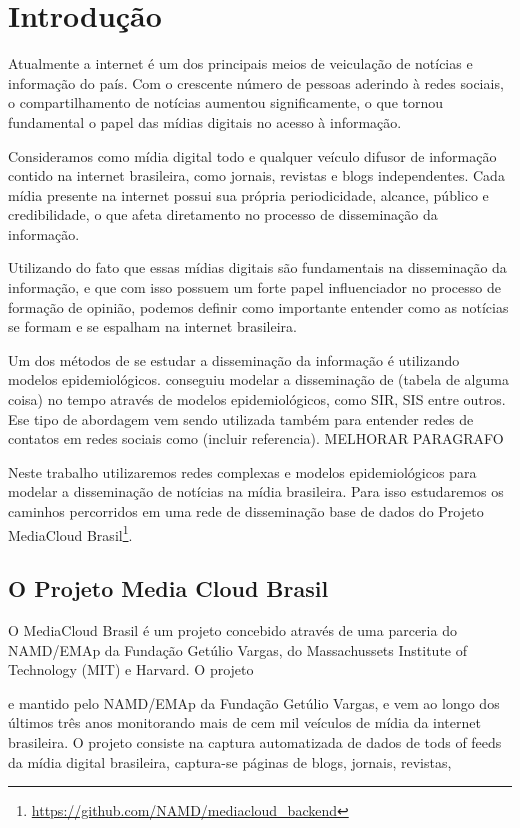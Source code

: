 \documentclass[a4paper,12pt]{article}
\begin{document}
\pagebreak

\section{Introdução}

Atualmente a internet é um dos principais meios de veiculação de notícias e informação do país. Com o crescente
número de pessoas aderindo à redes sociais, o compartilhamento de notícias aumentou significamente, o que tornou fundamental
o papel das mídias digitais no acesso à informação.

Consideramos como mídia digital todo e qualquer veículo difusor de informação contido na internet brasileira, como jornais, revistas e 
blogs independentes. Cada mídia presente na internet possui sua própria periodicidade, alcance, público e credibilidade, o que afeta
diretamento no processo de disseminação da informação.

Utilizando do fato que essas mídias digitais são fundamentais na disseminação da informação, e que com isso possuem um forte papel 
influenciador no processo de formação de opinião, podemos definir como importante entender como as notícias se formam e se espalham
na internet brasileira.

Um dos métodos de se estudar a disseminação da informação é utilizando modelos epidemiológicos. \cite{bettencourt2006power} conseguiu modelar a disseminação de (tabela de alguma coisa) no tempo através de modelos epidemiológicos, como SIR, SIS entre outros. Ese tipo
de abordagem vem sendo utilizada também para entender redes de contatos em redes sociais como (incluir referencia). MELHORAR PARAGRAFO

Neste trabalho utilizaremos redes complexas e modelos epidemiológicos para modelar a disseminação de notícias na mídia brasileira. 
Para isso
estudaremos os caminhos percorridos em uma rede de disseminação  base de dados do Projeto MediaCloud Brasil\footnote[1]{\url{https://github.com/NAMD/mediacloud_backend}}.


\subsection{O Projeto Media Cloud Brasil}

 O MediaCloud Brasil é um projeto concebido através de uma parceria do NAMD/EMAp da Fundação Getúlio Vargas, do Massachussets Institute of
 Technology (MIT)  e Harvard. O projeto

 e mantido pelo NAMD/EMAp da Fundação Getúlio Vargas, e vem ao longo dos últimos três anos 
 monitorando mais de cem mil veículos de mídia da internet brasileira. 
 O projeto consiste na captura automatizada de dados de tods of feeds da mídia digital brasileira, captura-se páginas de blogs, jornais, revistas,
 
\end{document}
